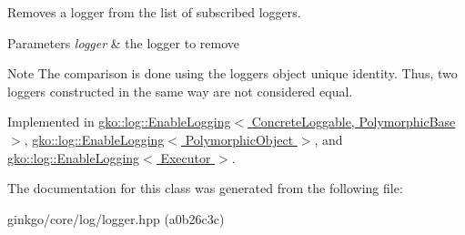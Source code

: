 Removes a logger from the list of subscribed loggers. 


\begin{DoxyParams}{Parameters}
{\em logger} & the logger to remove\\
\hline
\end{DoxyParams}
\begin{DoxyNote}{Note}
The comparison is done using the logger\textquotesingle{}s object unique identity. Thus, two loggers constructed in the same way are not considered equal. 
\end{DoxyNote}


Implemented in \hyperlink{classgko_1_1log_1_1EnableLogging_aba5317f8a03956a61d770e9b07fc65cc}{gko\+::log\+::\+Enable\+Logging$<$ Concrete\+Loggable, Polymorphic\+Base $>$}, \hyperlink{classgko_1_1log_1_1EnableLogging_aba5317f8a03956a61d770e9b07fc65cc}{gko\+::log\+::\+Enable\+Logging$<$ Polymorphic\+Object $>$}, and \hyperlink{classgko_1_1log_1_1EnableLogging_aba5317f8a03956a61d770e9b07fc65cc}{gko\+::log\+::\+Enable\+Logging$<$ Executor $>$}.



The documentation for this class was generated from the following file\+:\begin{DoxyCompactItemize}
\item 
ginkgo/core/log/logger.\+hpp (a0b26c3c)\end{DoxyCompactItemize}
